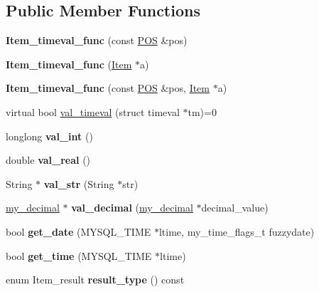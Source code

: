 \subsection*{Public Member Functions}
\begin{DoxyCompactItemize}
\item 
\mbox{\label{classItem__timeval__func_a9cd356c7be0da7bf8294c0c7feaf9b7f}} 
{\bfseries Item\+\_\+timeval\+\_\+func} (const \mbox{\hyperlink{structYYLTYPE}{P\+OS}} \&pos)
\item 
\mbox{\label{classItem__timeval__func_a836f1edabc3e98743fad3d7974e88651}} 
{\bfseries Item\+\_\+timeval\+\_\+func} (\mbox{\hyperlink{classItem}{Item}} $\ast$a)
\item 
\mbox{\label{classItem__timeval__func_a3676c12ba08a7d85735a1dc053722ee3}} 
{\bfseries Item\+\_\+timeval\+\_\+func} (const \mbox{\hyperlink{structYYLTYPE}{P\+OS}} \&pos, \mbox{\hyperlink{classItem}{Item}} $\ast$a)
\item 
virtual bool \mbox{\hyperlink{classItem__timeval__func_a529c82bce0479faa4b598d3a801645ca}{val\+\_\+timeval}} (struct timeval $\ast$tm)=0
\item 
\mbox{\label{classItem__timeval__func_a37414242673d7711c1a62b00b081e809}} 
longlong {\bfseries val\+\_\+int} ()
\item 
\mbox{\label{classItem__timeval__func_ae12d73f9ad0d7b9c0d54e2effcd45dc9}} 
double {\bfseries val\+\_\+real} ()
\item 
\mbox{\label{classItem__timeval__func_a0a6911d901c5e73ebcded2a49b0294f1}} 
String $\ast$ {\bfseries val\+\_\+str} (String $\ast$str)
\item 
\mbox{\label{classItem__timeval__func_afa273993d182bfb7586796046c4436c1}} 
\mbox{\hyperlink{classmy__decimal}{my\+\_\+decimal}} $\ast$ {\bfseries val\+\_\+decimal} (\mbox{\hyperlink{classmy__decimal}{my\+\_\+decimal}} $\ast$decimal\+\_\+value)
\item 
\mbox{\label{classItem__timeval__func_a63f6da40042c0d79884e3b9ee3492f1b}} 
bool {\bfseries get\+\_\+date} (M\+Y\+S\+Q\+L\+\_\+\+T\+I\+ME $\ast$ltime, my\+\_\+time\+\_\+flags\+\_\+t fuzzydate)
\item 
\mbox{\label{classItem__timeval__func_a4d8d45d1e8596c8c8bd61fdb57899662}} 
bool {\bfseries get\+\_\+time} (M\+Y\+S\+Q\+L\+\_\+\+T\+I\+ME $\ast$ltime)
\item 
\mbox{\label{classItem__timeval__func_a0f83a81e061f4d359ac6f4b260ea40d2}} 
enum Item\+\_\+result {\bfseries result\+\_\+type} () const
\end{DoxyCompactItemize}
